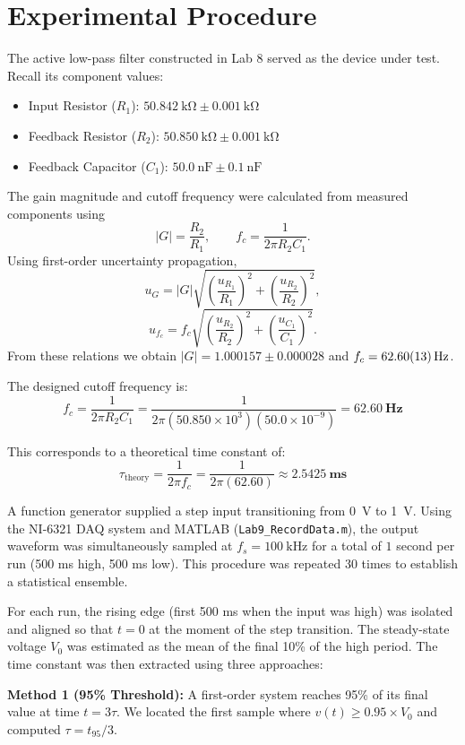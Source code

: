 \documentclass[11pt]{article}
\begin{document}
\section{Experimental Procedure}
The active low-pass filter constructed in Lab 8 served as the device under test. Recall its component values:
\begin{itemize}
  \item Input Resistor ($R_1$): $\SI{50.842}{\kilo\ohm} \pm \SI{0.001}{\kilo\ohm}$
  \item Feedback Resistor ($R_2$): $\SI{50.850}{\kilo\ohm} \pm \SI{0.001}{\kilo\ohm}$
  \item Feedback Capacitor ($C_1$): $\SI{50.0}{\nano\farad} \pm \SI{0.1}{\nano\farad}$
\end{itemize}

The gain magnitude and cutoff frequency were calculated from measured components using
\[ |G| = \frac{R_2}{R_1}, \qquad f_c = \frac{1}{2\pi R_2 C_1}. \]
Using first-order uncertainty propagation,
\[ u_G = |G|\sqrt{\left(\frac{u_{R_1}}{R_1}\right)^2 + \left(\frac{u_{R_2}}{R_2}\right)^2}, \]
\[ u_{f_c} = f_c\sqrt{\left(\frac{u_{R_2}}{R_2}\right)^2 + \left(\frac{u_{C_1}}{C_1}\right)^2}. \]
From these relations we obtain $|G| = 1.000157 \pm 0.000028$ and $f_c = \SI{62.60 \pm 0.13}{\hertz}$.

The designed cutoff frequency is:
\[ f_c = \frac{1}{2\pi R_2 C_1} = \frac{1}{2\pi (50.850 \times 10^3)(50.0 \times 10^{-9})} = \mathbf{\SI{62.60}{\hertz}} \]

This corresponds to a theoretical time constant of:
\[ \tau_{\text{theory}} = \frac{1}{2\pi f_c} = \frac{1}{2\pi (62.60)} \approx \mathbf{\SI{2.5425}{\milli\second}} \]

A function generator supplied a step input transitioning from \SI{0}{\volt} to \SI{1}{\volt}. Using the NI-6321 DAQ system and MATLAB (\texttt{Lab9\_RecordData.m}), the output waveform was simultaneously sampled at $f_s = \SI{100}{\kilo\hertz}$ for a total of $1$ second per run (500 ms high, 500 ms low). This procedure was repeated 30 times to establish a statistical ensemble.

For each run, the rising edge (first 500 ms when the input was high) was isolated and aligned so that $t = 0$ at the moment of the step transition. The steady-state voltage $V_0$ was estimated as the mean of the final 10\% of the high period. The time constant was then extracted using three approaches:

\textbf{Method 1 (95\% Threshold):} A first-order system reaches 95\% of its final value at time $t = 3\tau$. We located the first sample where $v(t) \geq 0.95 \times V_0$ and computed $\tau = t_{95} / 3$.
\end{document}

